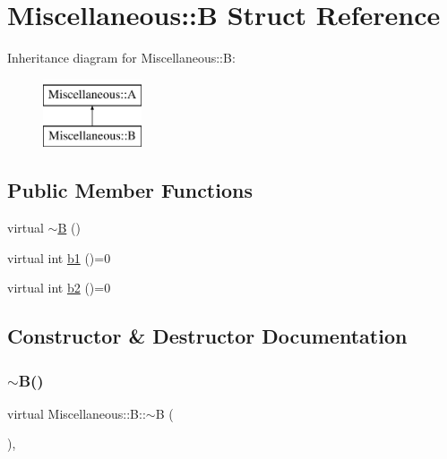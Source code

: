 \hypertarget{structMiscellaneous_1_1B}{}\section{Miscellaneous\+::B Struct Reference}
\label{structMiscellaneous_1_1B}
Inheritance diagram for Miscellaneous\+::B\+:\begin{figure}[H]
\begin{center}
\leavevmode
\includegraphics[height=2.000000cm]{structMiscellaneous_1_1B}
\end{center}
\end{figure}
\subsection*{Public Member Functions}
\begin{DoxyCompactItemize}
\item 
virtual \mbox{\hyperlink{structMiscellaneous_1_1B_a0186df4cce4f9a8dce92e6dd53332b6d}{$\sim$B}} ()
\item 
virtual int \mbox{\hyperlink{structMiscellaneous_1_1B_ae203b75ca393d9e4709b60c9952c41fc}{b1}} ()=0
\item 
virtual int \mbox{\hyperlink{structMiscellaneous_1_1B_ae01e13fa5245bd19a2cb0b899f2b5a2e}{b2}} ()=0
\end{DoxyCompactItemize}


\subsection{Constructor \& Destructor Documentation}
\mbox{\label{structMiscellaneous_1_1B_a0186df4cce4f9a8dce92e6dd53332b6d}} 
\subsubsection{\texorpdfstring{$\sim$B()}{~B()}}
{\footnotesize\ttfamily virtual Miscellaneous\+::\+B\+::$\sim$B (\begin{DoxyParamCaption}{ }\end{DoxyParamCaption})\hspace{0.3cm}{\ttfamily [inline]}, {\ttfamily [virtual]}}



